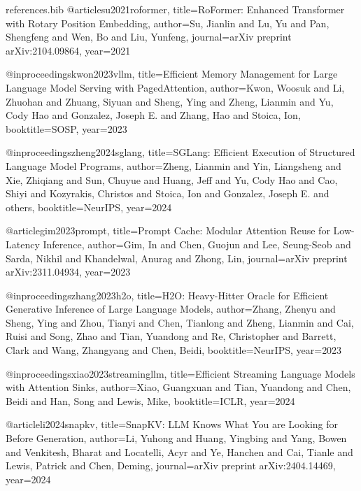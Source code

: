
\begin{filecontents*}[overwrite]{references.bib}
@article{su2021roformer,
  title={{RoFormer: Enhanced Transformer with Rotary Position Embedding}},
  author={Su, Jianlin and Lu, Yu and Pan, Shengfeng and Wen, Bo and Liu, Yunfeng},
  journal={arXiv preprint arXiv:2104.09864},
  year={2021}
}

@inproceedings{kwon2023vllm,
  title={{Efficient Memory Management for Large Language Model Serving with PagedAttention}},
  author={Kwon, Woosuk and Li, Zhuohan and Zhuang, Siyuan and Sheng, Ying and Zheng, Lianmin and Yu, Cody Hao and Gonzalez, Joseph E. and Zhang, Hao and Stoica, Ion},
  booktitle={SOSP},
  year={2023}
}

@inproceedings{zheng2024sglang,
  title={{SGLang: Efficient Execution of Structured Language Model Programs}},
  author={Zheng, Lianmin and Yin, Liangsheng and Xie, Zhiqiang and Sun, Chuyue and Huang, Jeff and Yu, Cody Hao and Cao, Shiyi and Kozyrakis, Christos and Stoica, Ion and Gonzalez, Joseph E. and others},
  booktitle={NeurIPS},
  year={2024}
}

@article{gim2023prompt,
  title={{Prompt Cache: Modular Attention Reuse for Low-Latency Inference}},
  author={Gim, In and Chen, Guojun and Lee, Seung-Seob and Sarda, Nikhil and Khandelwal, Anurag and Zhong, Lin},
  journal={arXiv preprint arXiv:2311.04934},
  year={2023}
}

@inproceedings{zhang2023h2o,
  title={{H2O: Heavy-Hitter Oracle for Efficient Generative Inference of Large Language Models}},
  author={Zhang, Zhenyu and Sheng, Ying and Zhou, Tianyi and Chen, Tianlong and Zheng, Lianmin and Cai, Ruisi and Song, Zhao and Tian, Yuandong and Re, Christopher and Barrett, Clark and Wang, Zhangyang and Chen, Beidi},
  booktitle={NeurIPS},
  year={2023}
}

@inproceedings{xiao2023streamingllm,
  title={{Efficient Streaming Language Models with Attention Sinks}},
  author={Xiao, Guangxuan and Tian, Yuandong and Chen, Beidi and Han, Song and Lewis, Mike},
  booktitle={ICLR},
  year={2024}
}

@article{li2024snapkv,
  title={{SnapKV: LLM Knows What You are Looking for Before Generation}},
  author={Li, Yuhong and Huang, Yingbing and Yang, Bowen and Venkitesh, Bharat and Locatelli, Acyr and Ye, Hanchen and Cai, Tianle and Lewis, Patrick and Chen, Deming},
  journal={arXiv preprint arXiv:2404.14469},
  year={2024}
}


\end{filecontents*}
